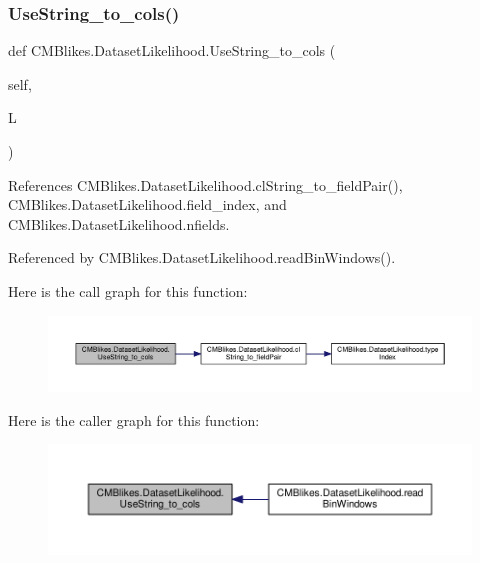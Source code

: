 \subsubsection{\texorpdfstring{Use\+String\+\_\+to\+\_\+cols()}{UseString\_to\_cols()}}
{\footnotesize\ttfamily def C\+M\+Blikes.\+Dataset\+Likelihood.\+Use\+String\+\_\+to\+\_\+cols (\begin{DoxyParamCaption}\item[{}]{self,  }\item[{}]{L }\end{DoxyParamCaption})}



References C\+M\+Blikes.\+Dataset\+Likelihood.\+cl\+String\+\_\+to\+\_\+field\+Pair(), C\+M\+Blikes.\+Dataset\+Likelihood.\+field\+\_\+index, and C\+M\+Blikes.\+Dataset\+Likelihood.\+nfields.



Referenced by C\+M\+Blikes.\+Dataset\+Likelihood.\+read\+Bin\+Windows().

Here is the call graph for this function\+:
\nopagebreak
\begin{figure}[H]
\begin{center}
\leavevmode
\includegraphics[width=350pt]{classCMBlikes_1_1DatasetLikelihood_a5e9c351429d38145bb855c6cae9aa8a9_cgraph}
\end{center}
\end{figure}
Here is the caller graph for this function\+:
\nopagebreak
\begin{figure}[H]
\begin{center}
\leavevmode
\includegraphics[width=350pt]{classCMBlikes_1_1DatasetLikelihood_a5e9c351429d38145bb855c6cae9aa8a9_icgraph}
\end{center}
\end{figure}
\mbox{\label{classCMBlikes_1_1DatasetLikelihood_a041f75367c5d576ee721138a8c979152}} 
